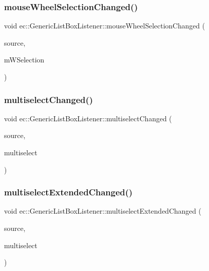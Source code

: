 \subsubsection{\texorpdfstring{mouse\+Wheel\+Selection\+Changed()}{mouseWheelSelectionChanged()}}
{\footnotesize\ttfamily void ec\+::\+Generic\+List\+Box\+Listener\+::mouse\+Wheel\+Selection\+Changed (\begin{DoxyParamCaption}\item[{agui\+::\+List\+Box $\ast$}]{source,  }\item[{bool}]{m\+W\+Selection }\end{DoxyParamCaption})\hspace{0.3cm}{\ttfamily [override]}}

\mbox{\label{classec_1_1_generic_list_box_listener_a6471d2661d969170f644bc4ebc3cb2f5}} 
\subsubsection{\texorpdfstring{multiselect\+Changed()}{multiselectChanged()}}
{\footnotesize\ttfamily void ec\+::\+Generic\+List\+Box\+Listener\+::multiselect\+Changed (\begin{DoxyParamCaption}\item[{agui\+::\+List\+Box $\ast$}]{source,  }\item[{bool}]{multiselect }\end{DoxyParamCaption})\hspace{0.3cm}{\ttfamily [override]}}

\mbox{\label{classec_1_1_generic_list_box_listener_ac440be24147c05e37a5be442aaa1d0f8}} 
\subsubsection{\texorpdfstring{multiselect\+Extended\+Changed()}{multiselectExtendedChanged()}}
{\footnotesize\ttfamily void ec\+::\+Generic\+List\+Box\+Listener\+::multiselect\+Extended\+Changed (\begin{DoxyParamCaption}\item[{agui\+::\+List\+Box $\ast$}]{source,  }\item[{bool}]{multiselect }\end{DoxyParamCaption})\hspace{0.3cm}{\ttfamily [override]}}

